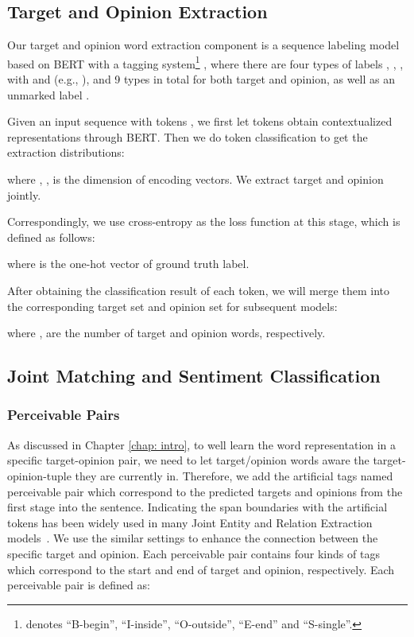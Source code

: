 \documentclass[11pt]{article}
\begin{document}
\subsection{Target and Opinion Extraction}
Our target and opinion word extraction component is a sequence labeling model based on BERT \cite{devlin2018bert} with a  tagging system\footnote{ denotes ``B-begin'', ``I-inside'', ``O-outside'', ``E-end'' and ``S-single''.} , where there are four types of labels , , ,  with  and  (e.g., ), and 9 types in total for both target and opinion, as well as an unmarked label . 

Given an input sequence with  tokens , we first let tokens obtain contextualized representations  through BERT. Then we do token classification to get the extraction distributions:

where , ,  is the dimension of encoding vectors. We extract target and opinion jointly. 

Correspondingly, we use cross-entropy as the loss function at this stage, which is defined as follows:

where 
 is the one-hot vector of ground truth label.

After obtaining the classification result of each token, we will merge them into the corresponding target set  and opinion set  for subsequent models:

where ,  are the number of target and opinion words, respectively.

\subsection{Joint Matching and Sentiment Classification}

\subsubsection{Perceivable Pairs}

As discussed in Chapter \ref{chap: intro}, to well learn the word representation in a specific target-opinion pair, we need to let target/opinion words aware the target-opinion-tuple they are currently in. Therefore, we add the artificial tags named perceivable pair which correspond to the predicted targets and opinions from the first stage into the sentence. 
Indicating the span boundaries with the artificial tokens has been widely used in many Joint Entity and Relation Extraction models~\cite{zhang2019ernie,soares2019matching,zhong2020frustratingly}. We use the similar settings to enhance the connection between the specific target and opinion. 
Each perceivable pair contains four kinds of tags which correspond to the start and end of target and opinion, respectively. 
Each perceivable pair is defined as:
\end{document}
